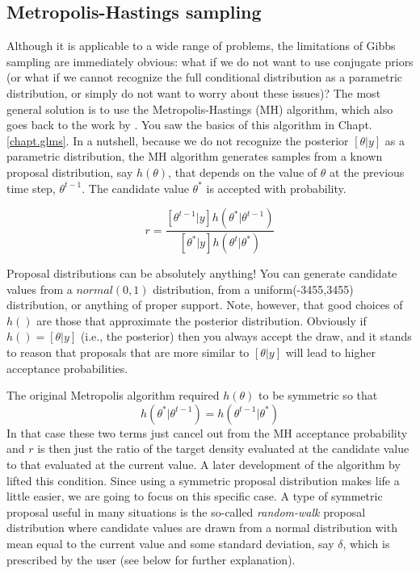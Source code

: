 \subsection{ Metropolis-Hastings sampling   }
\label{mcmc.sec.mh}

Although it is applicable to a wide range of problems, the limitations
of Gibbs sampling are immediately obvious: what if we do not want to
use conjugate priors (or what if we cannot recognize the full
conditional distribution as a parametric distribution, or simply do
not want to worry about these issues)? The most general solution is to
use the Metropolis-Hastings (MH) algorithm, which also goes back to
the work by \citet{metropolis_ulam:1953}. You saw the basics of this
algorithm in Chapt. \ref{chapt.glms}. In a nutshell, because we do not recognize the
posterior $[\theta|y]$ as a parametric distribution, the MH algorithm
generates samples from a known proposal distribution, say $h(\theta)$,
that depends on the value of $\theta$ at the previous time step,  $\theta^{t-1}$. The candidate value $\theta^*$ is accepted with probability. 

\[
r = \frac{ [\theta^{t-1}|y] h(\theta^{*}|\theta^{t-1})}
    {[\theta^{*}|y] h(\theta^{t}|\theta^{*}) }
\]

Proposal distributions can be absolutely
anything!  You can generate candidate values from a $normal(0,1)$
distribution, from a uniform(-3455,3455) distribution, or anything of
proper support.  Note, however, that good choices of $h()$ are those
that approximate the posterior distribution. Obviously if $h() =
[\theta|y]$ (i.e., the posterior) then you always accept the draw,
and it stands to reason that proposals that are more similar to
$[\theta|y]$ will lead to higher acceptance probabilities. 

The original Metropolis algorithm
required $h(\theta)$ to be symmetric so that
\[
h(\theta^{*}|\theta^{t-1}) = h(\theta^{t-1}|\theta^{*})
\]
In that case these two terms just cancel
out from the MH acceptance probability and $r$ is then just the ratio
of the target density evaluated at the candidate value to that
evaluated at the current value. A later
development of the algorithm by \citet{hastings:1970} lifted this
condition. 
Since using a symmetric proposal distribution makes life a little
easier, we are going to focus on this specific case. A type of symmetric proposal useful in many situations is the
so-called {\it random-walk} proposal distribution where candidate values
are drawn from a normal distribution with mean equal to the current
value and some standard deviation, say $\delta$, which is prescribed by
the user (see below for further explanation). 

